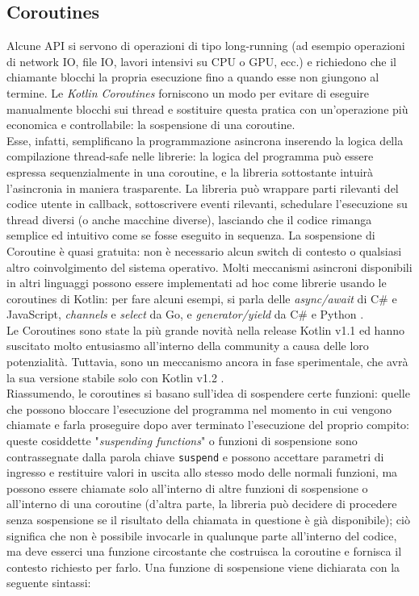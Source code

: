 \subsection{Coroutines}
Alcune API si servono di operazioni di tipo long-running (ad esempio operazioni di network IO, file IO, lavori intensivi su CPU o GPU, ecc.) e richiedono che il chiamante blocchi la propria esecuzione fino a quando esse non giungono al termine. Le {\em Kotlin Coroutines} forniscono un modo per evitare di eseguire manualmente blocchi sui thread e sostituire questa pratica con un'operazione più economica e controllabile: la sospensione di una coroutine.\\
Esse, infatti, semplificano la programmazione asincrona inserendo la logica della compilazione thread-safe nelle librerie: la logica del programma può essere espressa sequenzialmente in una coroutine, e la libreria sottostante intuirà l'asincronia in maniera trasparente. La libreria può wrappare parti rilevanti del codice utente in callback, sottoscrivere eventi rilevanti, schedulare l'esecuzione su thread diversi (o anche macchine diverse), lasciando che il codice rimanga semplice ed intuitivo come se fosse eseguito in sequenza. La sospensione di Coroutine è quasi gratuita: non è necessario alcun switch di contesto o qualsiasi altro coinvolgimento del sistema operativo. Molti meccanismi asincroni disponibili in altri linguaggi possono essere implementati ad hoc come librerie usando le coroutines di Kotlin: per fare alcuni esempi, si parla delle {\em async/await} di C\# \cite{asyawaitCSh} e JavaScript, {\em channels} e {\em select} da Go, e {\em generator/yield} da C\# e Python \cite{generatorPY}.\\
Le Coroutines sono state la più grande novità nella release Kotlin v1.1 ed hanno suscitato molto entusiasmo all'interno della community a causa delle loro potenzialità. Tuttavia, sono un meccanismo ancora in fase sperimentale, che avrà la sua versione stabile solo con Kotlin v1.2 \cite{kotlinV11}.\\
Riassumendo, le coroutines si basano sull'idea di sospendere certe funzioni: quelle che possono bloccare l'esecuzione del programma nel momento in cui vengono chiamate e farla proseguire dopo aver terminato l'esecuzione del proprio compito: queste cosiddette "{\em suspending functions}" o funzioni di sospensione sono contrassegnate dalla parola chiave \texttt{suspend} e possono accettare parametri di ingresso e restituire valori in uscita allo stesso modo delle normali funzioni, ma possono essere chiamate solo all'interno di altre funzioni di sospensione o all'interno di una coroutine (d'altra parte, la libreria può decidere di procedere senza sospensione se il risultato della chiamata in questione è già disponibile); ciò significa che non è possibile invocarle in qualunque parte all'interno del codice, ma deve esserci una funzione circostante che costruisca la coroutine e fornisca il contesto richiesto per farlo. Una funzione di sospensione viene dichiarata con la seguente sintassi:\\

